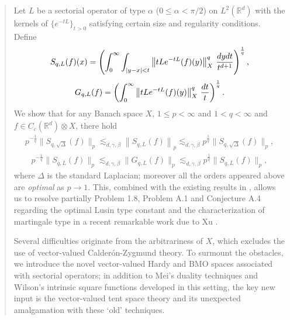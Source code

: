 \documentclass[oneside,english,a4wide]{amsart}
\numberwithin{equation}{section}
\numberwithin{figure}{section}
\theoremstyle{plain}
\theoremstyle{plain}
\theoremstyle{definition}
\theoremstyle{plain}
\theoremstyle{remark}
\theoremstyle{definition}
\theoremstyle{remark}
\theoremstyle{definition}
\newcommand{\real}{{\mathbb R}}
\newcommand{\8}{+\infty}
\renewcommand{\1}{\mathbbm{1}}
\newcommand\norm[1]{ \left\| #1 \right\| }
\newcommand\sk[1]{ \left( #1 \right) }
\renewcommand\d{{\rm d}}
\begin{document}
\begin{abstract}
Let $L$ be a sectorial operator of type $\alpha$ ($0 \leq \alpha < \pi/2$) on $L^2(\real^d)$ with the kernels of $\{e^{-tL}\}_{t>0}$ satisfying certain size and regularity conditions. Define
$$ S_{q,L}(f)(x) = \sk{\int_0^{\infty}\int_{|y-x| < t} \norm{tL{e^{-tL}} (f)(y) }_X^q \,\frac{\d y\d t}{t^{d+1}}}^{\frac{1}{q}},$$
$$G_{q,{L}}(f)=\sk{\int_0^{\infty} \norm{t{L}{e^{-t{L}}} (f)(y) }_X^q \,\frac{\d t}{t}}^{\frac{1}{q}}.$$
We show that for $\underline{\mathrm{any}}$  Banach space $X$, $1 \leq p < \infty$ and $1 < q < \infty$  and $f\in C_c(\mathbb R^d)\otimes X$, there hold
\begin{align*}
    p^{-\frac{1}{q}}\| S_{q,{\sqrt{\Delta}}}(f) \|_p \lesssim_{d, \gamma, \beta} \norm{ S_{q,L}(f) }_p \lesssim_{d, \gamma, \beta} p^{\frac{1}{q}}\| S_{q,{\sqrt{\Delta}}}(f) \|_p, 
    \end{align*}
        \begin{align*}
    p^{-\frac{1}{q}}\| S_{q,L}(f) \|_p \lesssim_{d, \gamma, \beta} \| G_{q,L}(f) \|_p \lesssim_{d, \gamma, \beta} p^{\frac{1}{q}}\| S_{q,L}(f) \|_p,
\end{align*}
where $\Delta$ is the standard Laplacian; moreover all the orders appeared above are {\it optimal} as $p\rightarrow1$. This, combined with the existing results in \cite{MTX,Ouyang2010}, allows us to resolve partially Problem 1.8, Problem A.1 and Conjecture A.4 regarding the optimal Lusin type constant and the characterization of martingale type in a recent remarkable work due to Xu \cite{Xu2021} . 

Several difficulties originate from the arbitrariness of $X$, which excludes the use of vector-valued Calder\'on-Zygmund theory. To surmount the obstacles,  we introduce the novel vector-valued Hardy and BMO spaces associated with sectorial operators;  in addition to Mei's duality techniques and Wilson's intrinsic square functions developed in this setting, the key new input is the vector-valued tent space theory and its unexpected amalgamation with these `old' techniques. 
\end{abstract}

\maketitle
\end{document}
